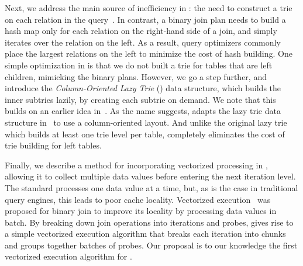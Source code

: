 Next, we address the main source of
  inefficiency in \GJ: the need to construct a trie on each relation
  in the query~\cite{DBLP:journals/pvldb/MhedhbiS19,DBLP:journals/pvldb/FreitagBSKN20}.  
In contrast,  a binary join plan needs to build a hash map only for each relation 
  on the right-hand side of a join,
  and simply iterates over the relation on the left.
As a result, query optimizers commonly place the largest relations on the left
 to minimize the cost of hash building.
One simple optimization in \FJ is that we do not built a trie for
tables that are left children, mimicking the binary plans.
%
However, we go a step further, and introduce the {\em Column-Oriented
  Lazy Trie} (\COLT) data structure, which builds the inner subtries
  lazily, by creating each subtrie on demand.  
We note that this builds on an earlier idea
in~\cite{DBLP:journals/pvldb/FreitagBSKN20}.  As the name suggests,
\COLT adapts the lazy trie data structure
in~\cite{DBLP:journals/pvldb/FreitagBSKN20} to use a column-oriented
layout.  And unlike the original lazy trie which builds at least one
trie level per table, \COLT completely eliminates the cost of trie
building for left tables.


Finally, we describe a method for incorporating vectorized
  processing in \FJ, allowing it to collect multiple data values
  before entering the next iteration level.  
The standard \GJ processes one data value at a time, but, as is the
  case in traditional query engines, this leads to poor cache
  locality.  
Vectorized execution~\cite{DBLP:conf/icde/PadmanabhanAMJ01} was proposed for binary join
  to improve its locality by processing data values in batch.
By breaking down join operations into iterations and probes, 
  \FJ gives rise to a simple vectorized execution algorithm
  that breaks each iteration into chunks and groups together 
  batches of probes.
Our proposal is to our knowledge the first vectorized execution algorithm for \GJ.

